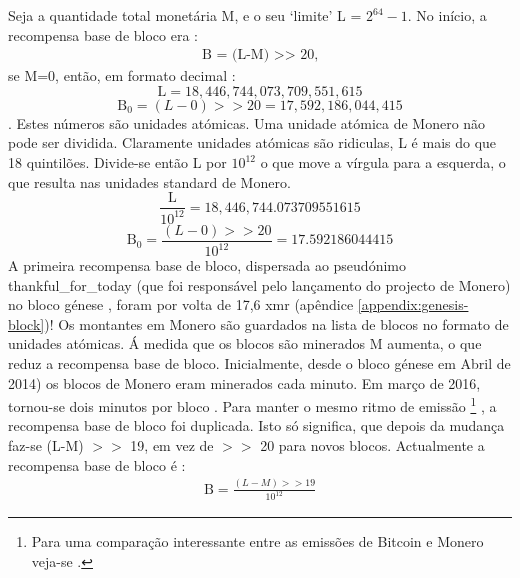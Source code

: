 Seja a quantidade total monetária M, e o seu `limite' L = $2^{64} - 1$.   
No início, a recompensa base de bloco era :
\begin{align*}
\textrm{B = (L-M) >> 20} ,
\end{align*}
se M=0, então, em formato decimal :\vspace{.175cm}
\[\textrm{L} = 18,446,744,073,709,551,615\]
\[\textrm{B}_0 = (L-0) >> 20 = 17,592,186,044,415\] .
Estes números são unidades atómicas. Uma unidade atómica de Monero não pode ser dividida. Claramente unidades atómicas são ridiculas, L é mais do que 18 quintilões.  
Divide-se então L por $10^{12}$ o que move a vírgula para a esquerda, o que resulta nas unidades standard de Monero.
\[\frac{\textrm{L}}{10^{12}} = 18,446,744.073709551615\]
\[\textrm{B}_0 = \frac{(L-0) >> 20}{10^{12}} = 17.592186044415\]
A primeira recompensa base de bloco, dispersada ao pseudónimo thankful\_for\_today (que foi responsável pelo lançamento do projecto de Monero) no bloco génese \cite{bitmonero-launched}, foram por volta de 17,6 xmr (apêndice \ref{appendix:genesis-block})! Os montantes em Monero são guardados na lista de blocos no formato de unidades atómicas.  
Á medida que os blocos são minerados M aumenta, o que reduz a recompensa base de bloco. Inicialmente, desde o bloco génese em Abril de 2014) os blocos de Monero eram minerados cada minuto. Em março de 2016, tornou-se dois minutos por bloco \cite{monero-0.9.3}. Para manter o mesmo ritmo de emissão 
\footnote{Para uma comparação interessante entre as emissões de Bitcoin e Monero veja-se \cite{monero-coin-emission}.}
, a recompensa base de bloco foi duplicada. Isto só significa, que depois da mudança faz-se (L-M) $>>$ 19, em vez de $>>$ 20 para novos blocos. Actualmente a recompensa base de bloco é :     
\begin{align*}
\textrm{B} = \frac{(L-M) >> 19}{10^{12}}
\end{align*}


